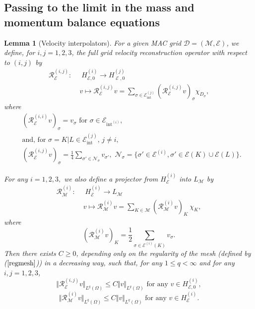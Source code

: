 \documentclass{amsart}
\newtheorem{lm}{Lemma}
\numberwithin{equation}{section}
\begin{document}
\subsection{Passing to the limit in the mass and momentum balance equations}

\begin{lm}[Velocity interpolators]\label{lem:uchapeau}
For a given MAC grid ${{\mathcal D}} =({{\mathcal M}}, {{\mathcal E}})$, we define, for $i,j= 1,2,3$, the  full grid velocity reconstruction operator with respect to $(i,j)$ by 
 \begin{align} \mathcal R_{{\mathcal E}}^{(i,j)} :\; & \; {H_{{{\mathcal E}},0}^{(i)}} \to H_{\operatorname{{\mathcal{E}}},0}^{(j)} \nonumber\\ 
					  & v \mapsto \mathcal R_{{\mathcal E}}^{(i,j)}  v =  \sum_{{{\sigma}}\in {{\mathcal E}_{\mathrm{int}}^{(j)}}} (\mathcal R_{{\mathcal E}}^{(i,j)}  v)_{{\sigma}} \chi_{D_{{\sigma}}}, \label{def:ufull}
\end{align}
where 
 \begin{align}
    &\label{uhat}
    (\mathcal R_{{\mathcal E}}^{(i,i)}  v)_{{\sigma}} = v_{{\sigma}} \textrm{ for } {{\sigma}} \in {{\mathcal E}}_\operatorname{int}^{(i)},
    \\
    &\nonumber \textrm{and, for }{{\sigma}}=K|L \in{{\mathcal E}_{\mathrm{int}}^{(j)}}, \, j \ne i,
    \\
    &(\mathcal R_{{\mathcal E}}^{(i,j)}  v)_{{\sigma}} = \frac{1}{4} \sum_{{{\sigma}}'\in\mathcal{N}_{{\sigma}}} v_{{{\sigma}}'}, 
   \, \,  \mathcal{N}_{{\sigma}}=\{{{\sigma}}'\in{\mathcal {E}^{(i)}}, {{\sigma}}' \in {{{\mathcal E}}(K)} \cup {{{\mathcal E}}(L)}\}. \label{nedge} 
\end{align}

For any $i=1,2,3,$ we also define a projector from $ {H_{{\mathcal E}}^{(i)}} $ into $L_{{\mathcal M}}$ by
 \begin{align} \mathcal R_{{\mathcal M}}^{(i)} :\; & \; {H_{{\mathcal E}}^{(i)}} \to L_{{\mathcal M}} \nonumber\\ 
					  & v \mapsto \mathcal R_{{\mathcal M}}^{(i)}  v =  \sum_{K \in {{\mathcal M}}} (\mathcal R_{{\mathcal M}}^{(i)}  v)_K \ \chi_{K}, \label{def:ufullprimal}
\end{align}
where 
  \begin{equation}
    \label{eq:interpolate_primal}
     (\mathcal R_{{\mathcal M}}^{(i)}  v)_K = \frac{1}{2} \sum_{{{\sigma}} \in {{\mathcal E}}^{(i)}(K)} v_{{\sigma}}.
\end{equation}
Then there exists $C \ge 0$, depending only on the regularity of the mesh (defined by ($\ref{regmesh}$)) in a decreasing way, such that, for any $1 \le q < \infty$ and for any $i,j = 1,2, 3$, 
\begin{equation*} 
\Vert \mathcal R_{{\mathcal E}}^{(i,j)} v \Vert_{L^q(\Omega)}  \le C \Vert v \Vert_{L^q(\Omega)} \textrm{ for any } v \in {H_{{{\mathcal E}},0}^{(i)}},
\end{equation*}
\begin{equation*} 
\Vert \mathcal R_{{\mathcal M}}^{(i)}  v \Vert_{L^q(\Omega)}  \le C \Vert v \Vert_{L^q(\Omega)} \textrm{ for any } v \in {H_{{\mathcal E}}^{(i)}}.
\end{equation*}


\end{lm}
\end{document}
